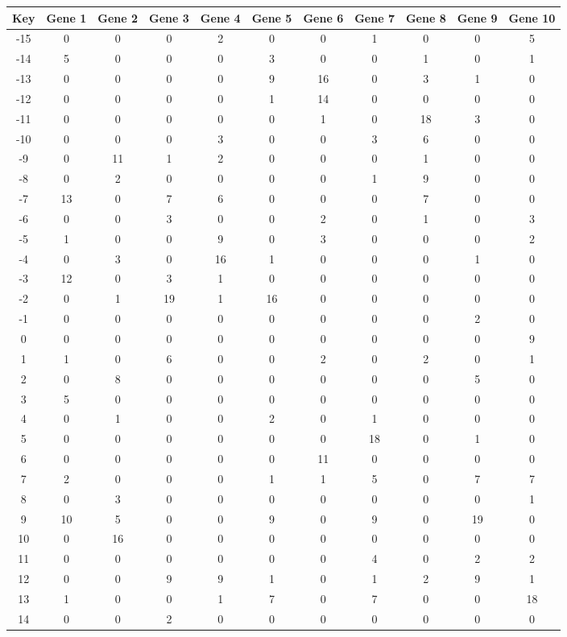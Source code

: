\begin{tabular}{|c|c|c|c|c|c|c|c|c|c|c|}
\hline
Key & Gene 1 & Gene 2 & Gene 3 & Gene 4 & Gene 5 & Gene 6 & Gene 7 & Gene 8 & Gene 9 & Gene 10 \\
\hline
-15 & 0 & 0 & 0 & 2 & 0 & 0 & 1 & 0 & 0 & 5 \\
-14 & 5 & 0 & 0 & 0 & 3 & 0 & 0 & 1 & 0 & 1 \\
-13 & 0 & 0 & 0 & 0 & 9 & 16 & 0 & 3 & 1 & 0 \\
-12 & 0 & 0 & 0 & 0 & 1 & 14 & 0 & 0 & 0 & 0 \\
-11 & 0 & 0 & 0 & 0 & 0 & 1 & 0 & 18 & 3 & 0 \\
-10 & 0 & 0 & 0 & 3 & 0 & 0 & 3 & 6 & 0 & 0 \\
-9 & 0 & 11 & 1 & 2 & 0 & 0 & 0 & 1 & 0 & 0 \\
-8 & 0 & 2 & 0 & 0 & 0 & 0 & 1 & 9 & 0 & 0 \\
-7 & 13 & 0 & 7 & 6 & 0 & 0 & 0 & 7 & 0 & 0 \\
-6 & 0 & 0 & 3 & 0 & 0 & 2 & 0 & 1 & 0 & 3 \\
-5 & 1 & 0 & 0 & 9 & 0 & 3 & 0 & 0 & 0 & 2 \\
-4 & 0 & 3 & 0 & 16 & 1 & 0 & 0 & 0 & 1 & 0 \\
-3 & 12 & 0 & 3 & 1 & 0 & 0 & 0 & 0 & 0 & 0 \\
-2 & 0 & 1 & 19 & 1 & 16 & 0 & 0 & 0 & 0 & 0 \\
-1 & 0 & 0 & 0 & 0 & 0 & 0 & 0 & 0 & 2 & 0 \\
0 & 0 & 0 & 0 & 0 & 0 & 0 & 0 & 0 & 0 & 9 \\
1 & 1 & 0 & 6 & 0 & 0 & 2 & 0 & 2 & 0 & 1 \\
2 & 0 & 8 & 0 & 0 & 0 & 0 & 0 & 0 & 5 & 0 \\
3 & 5 & 0 & 0 & 0 & 0 & 0 & 0 & 0 & 0 & 0 \\
4 & 0 & 1 & 0 & 0 & 2 & 0 & 1 & 0 & 0 & 0 \\
5 & 0 & 0 & 0 & 0 & 0 & 0 & 18 & 0 & 1 & 0 \\
6 & 0 & 0 & 0 & 0 & 0 & 11 & 0 & 0 & 0 & 0 \\
7 & 2 & 0 & 0 & 0 & 1 & 1 & 5 & 0 & 7 & 7 \\
8 & 0 & 3 & 0 & 0 & 0 & 0 & 0 & 0 & 0 & 1 \\
9 & 10 & 5 & 0 & 0 & 9 & 0 & 9 & 0 & 19 & 0 \\
10 & 0 & 16 & 0 & 0 & 0 & 0 & 0 & 0 & 0 & 0 \\
11 & 0 & 0 & 0 & 0 & 0 & 0 & 4 & 0 & 2 & 2 \\
12 & 0 & 0 & 9 & 9 & 1 & 0 & 1 & 2 & 9 & 1 \\
13 & 1 & 0 & 0 & 1 & 7 & 0 & 7 & 0 & 0 & 18 \\
14 & 0 & 0 & 2 & 0 & 0 & 0 & 0 & 0 & 0 & 0 \\
\hline
\end{tabular}
